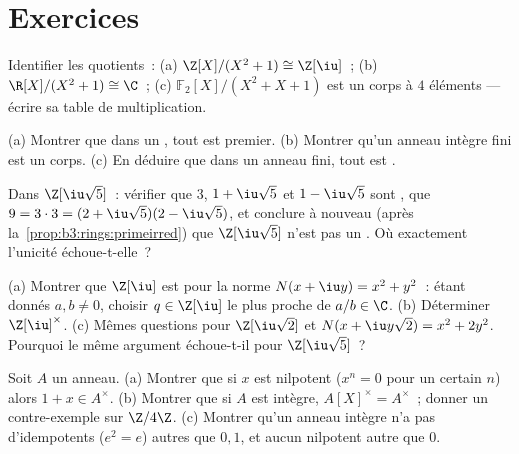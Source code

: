 \section{Exercices}

\begin{exercise}[$\star$]\label{exo:b3:rings:1}
Identifier les quotients~: (a) $\Z[X]/(X^2 + 1) \cong \Z[\iu]$~;
(b) $\R[X]/(X^2+1) \cong \C$~; (c) $\mathbb F_2[X]/(X^2 + X +
1)$ est un corps à $4$ éléments --- écrire sa table de
multiplication.
\end{exercise}

\begin{exercise}[$\star$]\label{exo:b3:rings:2}
(a) Montrer que dans un , tout  est
premier.
(b) Montrer qu'un anneau intègre fini est un corps.
(c) En déduire que dans un anneau fini, tout  est
.
\end{exercise}

\begin{exercise}[$\star$]\label{exo:b3:rings:3}
Dans $\Z[\iu\sqrt5]$~: vérifier que $3$, $1 + \iu\sqrt5$ et $1
- \iu\sqrt5$ sont , que $9 = 3\cdot 3 = (2 +
\iu\sqrt5)(2 - \iu\sqrt5)$, et conclure à nouveau (après
la~\cref{prop:b3:rings:primeirred}) que $\Z[\iu\sqrt5]$ n'est
pas un . Où exactement l'unicité échoue-t-elle~?
\end{exercise}

\begin{exercise}[$\star\star$]\label{exo:b3:rings:4}
(a) Montrer que $\Z[\iu]$ est  pour la norme $N(x + \iu
y) = x^2 + y^2$~: étant donnés $a, b \neq 0$, choisir $q \in
\Z[\iu]$ le plus proche de $a/b \in \C$.
(b) Déterminer $\Z[\iu]^\times$.
(c) Mêmes questions pour $\Z[\iu\sqrt2]$ et $N(x + \iu y\sqrt2)
= x^2 + 2y^2$. Pourquoi le même argument échoue-t-il pour
$\Z[\iu\sqrt5]$~?
\end{exercise}

\begin{exercise}[$\star\star$]\label{exo:b3:rings:5}
Soit $A$ un anneau. (a) Montrer que si $x$ est nilpotent ($x^n =
0$ pour un certain $n$) alors $1 + x \in A^\times$. (b) Montrer
que si $A$ est intègre, $A[X]^\times = A^\times$~; donner un
contre-exemple sur $\Z/4\Z$. (c) Montrer qu'un anneau intègre
n'a pas d'idempotents ($e^2 = e$) autres que $0, 1$, et aucun
nilpotent autre que $0$.
\end{exercise}

